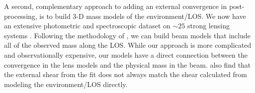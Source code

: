 A second, complementary approach to adding an external convergence in post-processing, is to build 3-D mass models of the environment/LOS.  We now have an extensive photometric and spectroscopic dataset on $\sim25$ strong lensing systems \citep{Momcheva06,Williams08, Wong11}. Following the methodology of \citet{Wong11}, we can build beam models that include all of the observed mass along the LOS.  While our approach is more complicated and observationally expensive, our models have a direct connection between the convergence in the lens models and the physical mass in the beam. \citet{Wong11} also find that the external shear from the fit does not always match the shear calculated from modeling the environment/LOS directly.